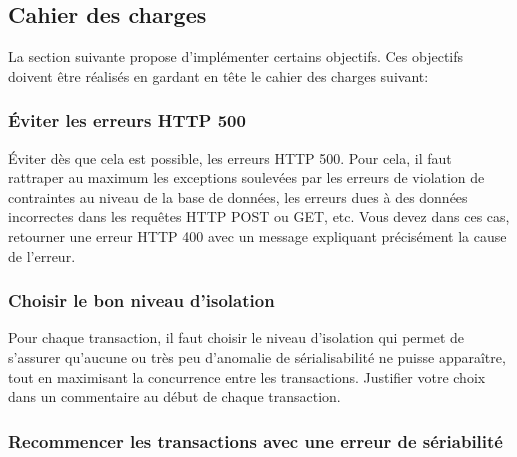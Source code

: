 \documentclass[10pt, vitellins]{article}
\newcounter{objectif}
\begin{document}
        


      \subsection*{Cahier des charges}

      La section suivante propose d'implémenter certains objectifs. Ces objectifs doivent être réalisés en gardant en tête le cahier des charges suivant:

      \subsubsection*{Éviter les erreurs HTTP 500}

      Éviter dès que cela est possible, les erreurs HTTP 500. Pour cela, il faut rattraper au maximum les exceptions soulevées par les erreurs de violation de contraintes au niveau de la base de données, les erreurs dues à des données incorrectes dans les requêtes HTTP POST ou GET, etc. Vous devez dans ces cas, retourner une erreur HTTP 400 avec un message expliquant précisément la cause de l'erreur.

      \subsubsection*{Choisir le bon niveau d'isolation}

      Pour chaque transaction, il faut choisir le niveau d'isolation qui permet de s'assurer qu'aucune ou très peu d'anomalie de sérialisabilité ne puisse apparaître, tout en maximisant la concurrence entre les transactions. Justifier votre choix dans un commentaire au début de chaque transaction. 
      
      \subsubsection*{Recommencer les transactions avec une erreur de sériabilité}
\end{document}
